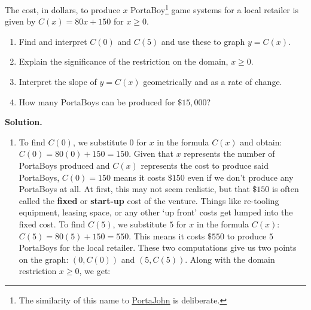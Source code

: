 \documentclass{ximera}
\begin{document}
\begin{example} \label{PortaBoyCost} The cost, in dollars, to produce $x$ PortaBoy\footnote{The similarity of this name to \href{http://www.toilets.com}{\underline{PortaJohn}} is deliberate.} game systems for a local retailer is given by   $C(x) = 80x + 150$ for $x \geq 0$.  

\begin{enumerate}

\item  Find and interpret $C(0)$ and $C(5)$ and use these to graph $y = C(x)$.

\item  Explain the significance of the restriction on the domain, $x \geq 0$.

\item  Interpret the slope of $y = C(x)$ geometrically and as a rate of change.

\item How many PortaBoys can be produced for $\$15,\! 000$?  

\end{enumerate}

\smallskip

{\bf Solution.}  

\begin{enumerate}

\item  To find $C(0)$, we substitute $0$ for $x$ in the formula $C(x)$ and obtain: $C(0) = 80(0) + 150 = 150$.  Given that $x$ represents the number of PortaBoys produced and $C(x)$ represents the cost to produce said PortaBoys, $C(0) = 150$ means it costs $\$150$ even if we don't produce any PortaBoys at all.  At first, this may not seem realistic, but that $\$150$ is often called the \textbf{fixed} or \textbf{start-up} cost of the venture.  Things like re-tooling equipment, leasing space, or any other `up front' costs get lumped into the fixed cost.  To find $C(5)$, we substitute $5$ for  $x$  in the formula $C(x)$:   $C(5) = 80(5)+150 = 550$.  This  means it costs $\$550$ to produce $5$ PortaBoys for the local retailer.  These two computations give us two points on the graph: $(0, C(0))$ and $(5, C(5))$.  Along with the domain restriction $x \geq 0$, we get:


\begin{center}


\end{center}
\end{enumerate}
\end{example}
\end{document}
